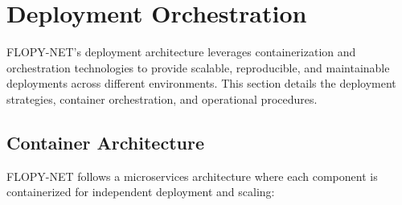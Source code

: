 \section{Deployment Orchestration}
\label{sec:deployment-orchestration}

FLOPY-NET's deployment architecture leverages containerization and orchestration technologies to provide scalable, reproducible, and maintainable deployments across different environments. This section details the deployment strategies, container orchestration, and operational procedures.

\subsection{Container Architecture}

FLOPY-NET follows a microservices architecture where each component is containerized for independent deployment and scaling:

